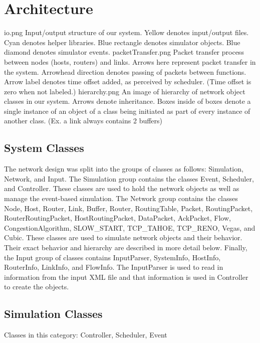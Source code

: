 

\section{Architecture}



io.png
Input/output structure of our system. Yellow denotes input/output files. Cyan denotes helper libraries. Blue rectangle denotes simulator objects. Blue diamond denotes simulator events. 
packetTransfer.png
Packet transfer process between nodes (hosts, routers) and links. Arrows here represent packet transfer in the system. Arrowhead direction denotes passing of packets between functions. Arrow label denotes time offset added, as perceived by scheduler. (Time offset is zero when not labeled.)
hierarchy.png
An image of hierarchy of network object classes in our system. Arrows denote inheritance. Boxes inside of boxes denote a single instance of an object of a class being initiated as part of every instance of another class. (Ex. a link always contains 2 buffers)

\subsection{System Classes}
    The network design was split into the groups of classes as follows: Simulation, Network, and Input. The Simulation group contains the classes Event, Scheduler, and Controller. These classes are used to hold the network objects as well as manage the event-based simulation. The Network group contains the classes Node, Host, Router, Link, Buffer, Router, RoutingTable, Packet, RoutingPacket, RouterRoutingPacket, HostRoutingPacket, DataPacket, AckPacket, Flow, CongestionAlgorithm, SLOW\_START, TCP\_TAHOE, TCP\_RENO, Vegas, and Cubic. These classes are used to simulate network objects and their behavior. Their exact behavior and hierarchy are described in more detail below. Finally, the Input group of classes contains InputParser, SystemInfo, HostInfo, RouterInfo, LinkInfo, and FlowInfo. The InputParser is used to read in information from the input XML file and that information is used in Controller to create the objects.

\subsection{Simulation Classes}
    Classes in this category: Controller, Scheduler, Event

